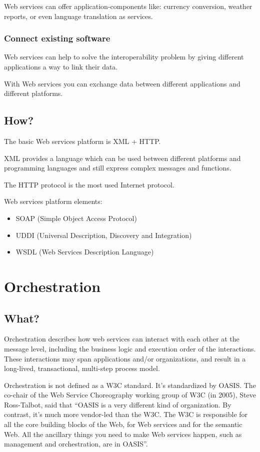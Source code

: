 \documentclass[12pt,a4paper]{article}
\begin{document}
Web services can offer application-components like: currency conversion, weather reports, or even language translation as services.

\subsubsection{Connect existing software}

Web services can help to solve the interoperability problem by giving different applications a way to link their data.

With Web services you can exchange data between different applications and different platforms.

\subsection{How?}
The basic Web services platform is XML + HTTP.

XML provides a language which can be used between different platforms and programming languages and still express complex messages and functions.

The HTTP protocol is the most used Internet protocol.

Web services platform elements:
\begin{itemize}
\item SOAP (Simple Object Access Protocol)
\item UDDI (Universal Description, Discovery and Integration)
\item WSDL (Web Services Description Language)
\end{itemize}



\section{Orchestration}
\subsection{What?}
Orchestration describes how web services can interact with each other at the message level, including the business logic and execution order of the interactions. These interactions may span applications and/or organizations, and result in a long-lived, transactional, multi-step process model.

Orchestration is not defined as a W3C standard. It's standardized by OASIS. The co-chair of the Web Service Choreography working group of W3C (in 2005), Steve Ross-Talbot, said that ``OASIS is a very different kind of organization. By contrast, it's much more vendor-led than the W3C. The W3C is responsible for all the core building blocks of the Web, for Web services and for the semantic Web. All the ancillary things you need to make Web services happen, such as management and orchestration, are in OASIS''.
\end{document}
